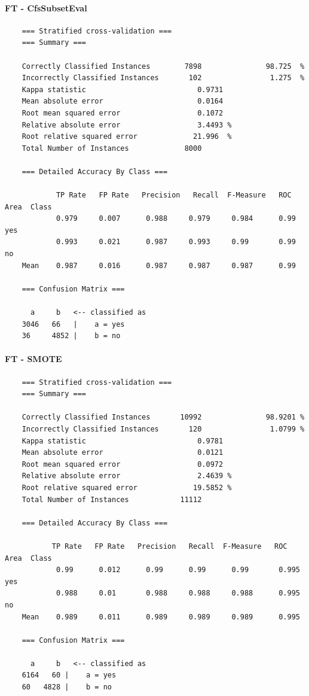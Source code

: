 \paragraph{FT - CfsSubsetEval}
{\footnotesize
	\begin{verbatim}
	=== Stratified cross-validation ===
	=== Summary ===
	
	Correctly Classified Instances        7898               98.725  %
	Incorrectly Classified Instances       102                1.275  %
	Kappa statistic                          0.9731
	Mean absolute error                      0.0164
	Root mean squared error                  0.1072
	Relative absolute error                  3.4493 %
	Root relative squared error             21.996  %
	Total Number of Instances             8000     
	
	=== Detailed Accuracy By Class ===
	
	        TP Rate   FP Rate   Precision   Recall  F-Measure   ROC Area  Class
	        0.979     0.007      0.988     0.979     0.984      0.99     yes
	        0.993     0.021      0.987     0.993     0.99       0.99     no
	Mean    0.987     0.016      0.987     0.987     0.987      0.99 
	
	=== Confusion Matrix ===
	
	  a     b   <-- classified as
	3046   66   |    a = yes
	36     4852 |    b = no
	\end{verbatim}
}

\paragraph{FT - SMOTE}
{\footnotesize
	\begin{verbatim}
	=== Stratified cross-validation ===
	=== Summary ===
	
	Correctly Classified Instances       10992               98.9201 %
	Incorrectly Classified Instances       120                1.0799 %
	Kappa statistic                          0.9781
	Mean absolute error                      0.0121
	Root mean squared error                  0.0972
	Relative absolute error                  2.4639 %
	Root relative squared error             19.5852 %
	Total Number of Instances            11112     
	
	=== Detailed Accuracy By Class ===
	
	       TP Rate   FP Rate   Precision   Recall  F-Measure   ROC Area  Class
	        0.99      0.012      0.99      0.99      0.99       0.995    yes
	        0.988     0.01       0.988     0.988     0.988      0.995    no
	Mean    0.989     0.011      0.989     0.989     0.989      0.995
	
	=== Confusion Matrix ===
	
	  a     b   <-- classified as
	6164   60 |    a = yes
	60   4828 |    b = no
	\end{verbatim}
}

